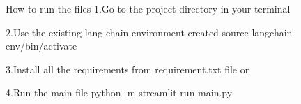 How to run the files
1.Go to the project directory in your terminal 

2.Use the existing lang chain environment created 	
source langchain-env/bin/activate

3.Install all the requirements from requirement.txt file or 	
	
4.Run the main file 	
python -m streamlit run main.py	
